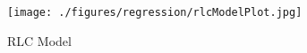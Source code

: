\begin{figure}[ht!]
\texttt{[image: ./figures/regression/rlcModelPlot.jpg]}
\centering
\caption{RLC Model}
\label{fig:rlcModel}
\end{figure}
